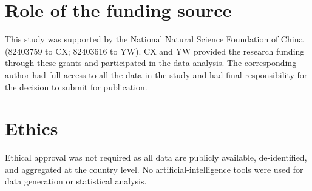 \documentclass[12pt,a4paper]{article}
\begin{document}
\section*{Role of the funding source}

This study was supported by the National Natural Science Foundation of China (82403759 to CX; 82403616 to YW). CX and YW provided the research funding through these grants and participated in the data analysis. The corresponding author had full access to all the data in the study and had final responsibility for the decision to submit for publication.

\section*{Ethics}
Ethical approval was not required as all data are publicly available,
de-identified, and aggregated at the country level. No artificial-intelligence tools were used for data generation or statistical analysis.




\newpage
\end{document}
